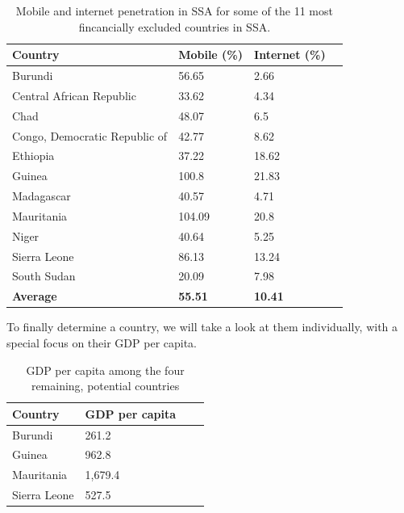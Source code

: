 \documentclass[11pt, a4paper]{article}
\begin{document}
\begin{table}[ht]
\centering
\begin{tabular}{|l|l|l|l|}
\hline
\textbf{Country}        & \textbf{Mobile (\%)} & \textbf{Internet (\%)} \\ \hline
Burundi             & 56.65             & 2.66                                        \\ \hline
Central African Republic    & 33.62             & 4.34                                      \\ \hline
Chad              & 48.07             & 6.5                                       \\ \hline
Congo, Democratic Republic of & 42.77             & 8.62                                       \\ \hline
Ethiopia            & 37.22             & 18.62                                       \\ \hline
Guinea            & 100.8             & 21.83                                       \\ \hline
Madagascar          & 40.57             & 4.71                                        \\ \hline
Mauritania          & 104.09            & 20.8                                       \\ \hline
Niger             & 40.64             & 5.25                                        \\ \hline
Sierra Leone          & 86.13             & 13.24                                       \\ \hline
South Sudan           & 20.09             & 7.98                                        \\ \hline
\textbf{Average}        & \textbf{55.51}        & \textbf{10.41}                                        \\ \hline
\end{tabular}
\caption{Mobile\cite{wbdata} and internet\cite{wbdata} penetration in SSA for some of the 11 most fincancially excluded countries in SSA.}
\label{tab:mob_internet_ssa}
\end{table}


To finally determine a country, we will take a look at them individually, with a special focus on their GDP per capita.

\begin{table}[ht]
\centering
\begin{tabular}{|l|l|l|l|}
\hline
\textbf{Country}        & \textbf{GDP per capita} \\ \hline
Burundi             & 261.2   \\ \hline
Guinea            & 962.8 \\ \hline
Mauritania          & 1,679.4 \\ \hline
Sierra Leone          & 527.5 \\ \hline
\end{tabular}
\caption{GDP per capita\cite{wbdata} among the four remaining, potential countries}
\label{tab:gdp_internet_ssa}
\end{table}
\end{document}
